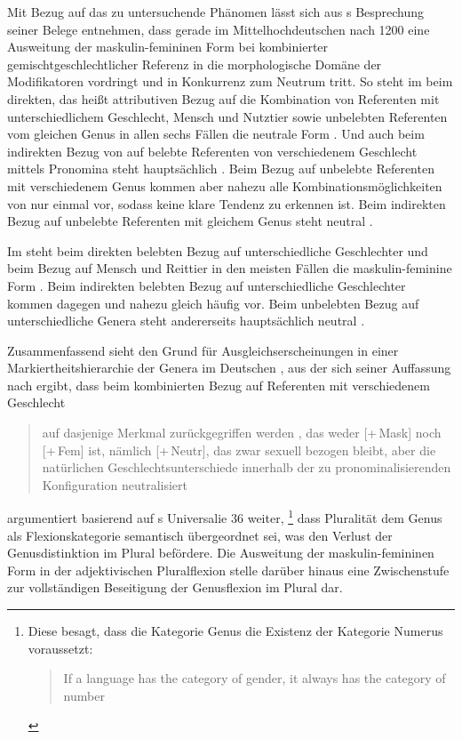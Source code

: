 Mit Bezug auf das zu untersuchende Phänomen lässt sich aus
\citeauthor{askedal1973}s Besprechung seiner Belege entnehmen, dass gerade im
Mittelhochdeutschen nach 1200 eine Ausweitung der
maskulin-femininen Form bei kombinierter gemischt\-geschlechtlicher Referenz in
die morphologische Domäne der Modifikatoren vordringt und in Konkurrenz zum
Neutrum tritt. So steht im  beim direkten, das heißt attributiven
Bezug auf die Kombination von Referenten mit unterschiedlichem Geschlecht,
Mensch und Nutztier sowie unbelebten Referenten vom gleichen Genus in allen
sechs Fällen die neutrale Form . Und auch beim indirekten Bezug
von  auf belebte Referenten von verschiedenem Geschlecht mittels
Pronomina steht hauptsächlich . Beim Bezug auf unbelebte
Referenten mit verschiedenem Genus kommen aber nahezu alle
Kombinationsmöglichkeiten von  nur einmal vor,
sodass keine klare Tendenz zu erkennen ist. Beim indirekten Bezug auf unbelebte
Referenten mit gleichem Genus steht neutral
 \autocites[145--148,
158--161]{askedal1973}[nach][]{lachmannhartl1952}.

Im  steht beim direkten belebten Bezug auf unterschiedliche
Geschlechter und beim Bezug auf Mensch und Reittier in den meisten Fällen die
maskulin-feminine Form .
Beim indirekten belebten Bezug auf unterschiedliche Geschlechter kommen dagegen
 und  nahezu gleich häufig vor. Beim unbelebten
Bezug auf unterschiedliche Genera steht andererseits hauptsächlich neutral
 \autocites[95--99,
126--128]{askedal1973}[nach][]{maroldschroeder1969}.

Zusammenfassend sieht \citeauthor{askedal1973} den Grund für
Ausgleichserscheinungen in einer Markiertheitshierarchie der Genera im
Deutschen \autocite[241--247]{askedal1973}, aus der sich seiner Auffassung nach
ergibt, dass beim kombinierten Bezug auf Referenten mit verschiedenem
Geschlecht \blockcquote[253]{askedal1973}{auf dasjenige Merkmal zurückgegriffen
werden , das weder [+\,Mask] noch [+\,Fem] ist, nämlich
[+\,Neutr], das zwar sexuell bezogen bleibt, aber die natürlichen
Geschlechts\-unterschiede innerhalb der zu pronominalisierenden Konfiguration
neutralisiert}. \citet[173--177]{askedal1973} argumentiert basierend auf
\citeauthor{greenberg1966}s Universalie 36 weiter,%
%
	\footnote{Diese besagt, dass die Kategorie Genus die Existenz der Kategorie
		Numerus voraussetzt:
		\foreignblockcquote{english}[112]{greenberg1966}{If a language has
		the category of gender, it always has the category of number}.%
	}
%
dass Pluralität dem Genus als Flexionskategorie semantisch übergeordnet sei,
was den Verlust der Genusdistinktion im Plural befördere. Die Ausweitung der
maskulin-femininen Form in der adjektivischen Plural\-flexion stelle darüber
hinaus eine Zwischenstufe zur vollständigen Beseitigung der Genusflexion im
Plural dar.

